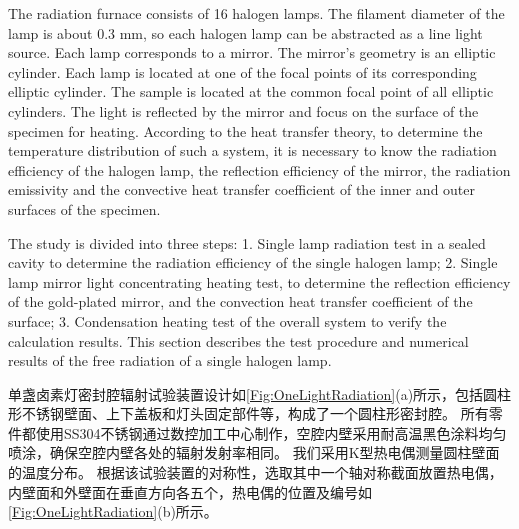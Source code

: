The radiation furnace consists of 16 halogen lamps. The filament diameter of the lamp is about 0.3 mm, so each halogen lamp can be abstracted as a line light source.
Each lamp corresponds to a mirror. The mirror's geometry is an elliptic cylinder. Each lamp is located at one of the focal points of its corresponding elliptic cylinder. The sample is located at the common focal point of all elliptic cylinders. The light is reflected by the mirror and focus on the surface of the specimen for heating.
According to the heat transfer theory, to determine the temperature distribution of such a system, it is necessary to know the radiation efficiency of the halogen lamp, the reflection efficiency of the mirror, the radiation emissivity and the convective heat transfer coefficient of the inner and outer surfaces of the specimen.

The study is divided into three steps:
1. Single lamp radiation test in a sealed cavity to determine the radiation efficiency of the single halogen lamp;
2. Single lamp mirror light concentrating heating test, to determine the reflection efficiency of the gold-plated mirror, and the convection heat transfer coefficient of the surface;
3. Condensation heating test of the overall system to verify the calculation results.
This section describes the test procedure and numerical results of the free radiation of a single halogen lamp.

单盏卤素灯密封腔辐射试验装置设计如\ref{Fig:OneLightRadiation}(a)所示，包括圆柱形不锈钢壁面、上下盖板和灯头固定部件等，构成了一个圆柱形密封腔。
所有零件都使用SS304不锈钢通过数控加工中心制作，空腔内壁采用耐高温黑色涂料均匀喷涂，确保空腔内壁各处的辐射发射率相同。
我们采用K型热电偶测量圆柱壁面的温度分布。
根据该试验装置的对称性，选取其中一个轴对称截面放置热电偶，内壁面和外壁面在垂直方向各五个，热电偶的位置及编号如\ref{Fig:OneLightRadiation}(b)所示。


